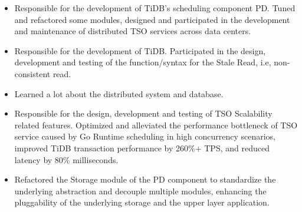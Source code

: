 \documentclass{resume}
\newcommand{\en}[1]{#1}
\newcommand{\zh}[1]{}
\begin{document}
\en{}
\zh{\datedsubsection{\textbf{\href{https://pingcap.com/zh/}{北京平凯星辰科技发展有限公司（PingCAP Inc.）}}}{2020/06 -- 至今}}
\en{}
\zh{\role{数据库研发}{研发工程师实习}}
\begin{itemize}
      \item \en{Responsible for the development of TiDB's scheduling component PD. Tuned and refactored some modules, designed and participated in the development and maintenance of distributed TSO services across data centers.}
            \zh{负责 TiDB 调度组件 PD 的研发工作。调优重构了部分模块，设计并参与了跨数据中心分布式授时服务的开发与维护}
      \item \en{Responsible for the development of TiDB. Participated in the design, development and testing of the function/syntax for the Stale Read, i.e, non-consistent read.}
            \zh{负责 TiDB 的研发工作。参与了 Stale Read 非一致性读的功能语法设计、开发与测试等工作}
      \item \en{Learned a lot about the distributed system and database.}
            \zh{学到了很多关于分布式系统和数据库的知识}
\end{itemize}
\en{}
\zh{\role{数据库研发}{研发工程师}}
\begin{itemize}
      \item \en{Responsible for the design, development and testing of TSO Scalability related features. Optimized and alleviated the performance bottleneck of TSO service caused by Go Runtime scheduling in high concurrency scenarios, improved TiDB transaction performance by 260\%+ TPS, and reduced latency by 80\% milliseconds.}
            \zh{负责 TSO Scalability 相关功能的设计，开发和测试。优化缓解了高并发场景下 Go Runtime 调度导致的 TSO 服务性能瓶颈问题，提升 TiDB 事务性能 260\%+ TPS，降低延迟 80\% 毫秒}
      \item \en{Refactored the Storage module of the PD component to standardize the underlying abstraction and decouple multiple modules, enhancing the pluggability of the underlying storage and the upper layer application.}
            \zh{重构了 PD 组件的 Storage 模块，规范底层抽象并解耦多个模块，加强了底层存储和上层应用的可插拔性}
\end{itemize}
\end{document}
